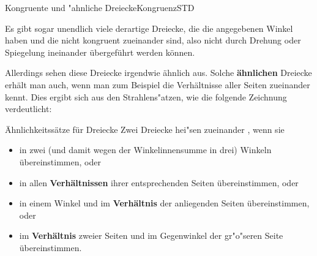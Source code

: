 \begin{MXContent}{Kongruente und "ahnliche Dreiecke}{Kongruenz}{STD}
\begin{MExample}
Es gibt sogar unendlich viele derartige Dreiecke, die die angegebenen Winkel 
haben und die nicht kongruent zueinander sind, also nicht durch Drehung oder 
Spiegelung ineinander \"ubergef\"uhrt werden k\"onnen.
\end{MExample}

Allerdings sehen diese Dreiecke irgendwie \"ahnlich aus. Solche 
\textbf{\"ahnlichen} Dreiecke erh\"alt man auch, wenn man zum Beispiel die 
Verh\"altnisse aller Seiten zueinander kennt. 
Dies ergibt sich aus den Strahlens"atzen, wie die folgende Zeichnung 
verdeutlicht: 

\begin{center}
\end{center}

\begin{MXInfo}{\"Ahnlichkeitss\"atze f\"ur Dreiecke}%
Zwei Dreiecke hei"sen zueinander , wenn
sie
\begin{itemize}
 \item in zwei (und damit wegen der Winkelinnensumme in drei) 
   Winkeln \"ubereinstimmen, oder
 \item in allen \textbf{Verh\"altnissen} ihrer entsprechenden Seiten 
   \"ubereinstimmen, oder
 \item in einem Winkel und im \textbf{Verh\"altnis} der anliegenden 
   Seiten \"ubereinstimmen, oder
 \item im \textbf{Verh\"altnis} zweier Seiten und im Gegenwinkel der 
   gr"o"seren Seite \"ubereinstimmen.
\end{itemize}
\end{MXInfo}


\end{MXContent}
